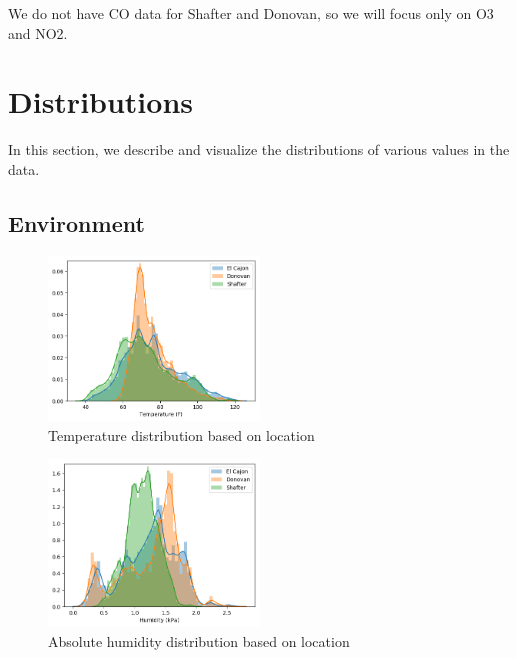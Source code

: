 \documentclass[journal abbreviation, manuscript]{copernicus}
\begin{document}
We do not have CO data for Shafter and Donovan, so we will focus only on
O3 and NO2.

\section{Distributions}
In this section, we describe
and visualize the distributions
of various values in the data.

\subsection{Environment}

\begin{figure}[H]
\centering
\includegraphics[width=0.5\textwidth]{results/distributions/temperature.png}
\caption{Temperature distribution based on
location}
\label{fig:temperature}
\end{figure}

\begin{figure}[H]
\centering
\includegraphics[width=0.5\textwidth]{results/distributions/humidity.png}
\caption{Absolute humidity distribution based on
location}
\label{fig:humidity}
\end{figure}
\end{document}
